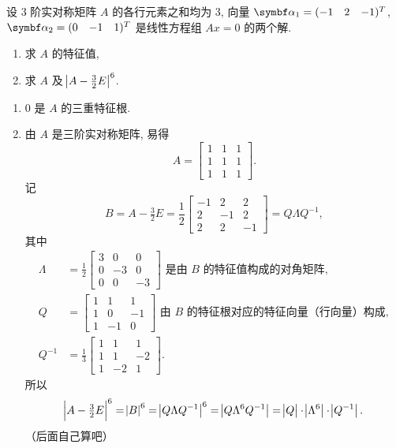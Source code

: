 \begin{exercise}
    设 $3$ 阶实对称矩阵 $A$ 的各行元素之和均为 $3$, 向量 $\vect{\alpha}_1 = (-1\quad 2\quad {-1})^T$, $\vect{\alpha}_2 = (0\quad {-1}\quad 1)^T$ 是线性方程组 $Ax = 0$ 的两个解.
    \begin{enumerate}[(1)]
        \item 求 $A$ 的特征值, 
        \item 求 $A$ 及 $\abs[1]{A-\tfrac 32 E}^6$.
    \end{enumerate}
\end{exercise}

\begin{solution}
    \begin{enumerate}[(1)]
        \item $0$ 是 $A$ 的三重特征根.
        \item 由 $A$ 是三阶实对称矩阵, 易得
        \[
        A = \begin{bmatrix}
        1 & 1 & 1\\ 1 & 1 & 1\\ 1 & 1 & 1
        \end{bmatrix}.
        \]
        记
        \[
        B = A - \tfrac 32 E = \frac 12\begin{bmatrix}
        -1 & 2 & 2 \\ 2 & -1 & 2 \\ 2 & 2 & -1
        \end{bmatrix} = Q\Lambda Q^{-1},
        \]
        其中
        \begin{align*}
        \Lambda &= \frac 12\begin{bmatrix}
        3 & 0 & 0 \\ 0 & -3 & 0 \\ 0 & 0 & -3
        \end{bmatrix} \text{\ 是由 $B$ 的特征值构成的对角矩阵}, \\
        Q &= \begin{bmatrix}
        1 & 1 & 1 \\ 1 & 0 & -1 \\ 1 & -1 & 0
        \end{bmatrix} \text{\ 由 $B$ 的特征根对应的特征向量（行向量）构成}, \\
        Q^{-1} &= \frac 13\begin{bmatrix}
        1 & 1 & 1 \\ 1 & 1 & -2 \\ 1 & -2 & 1
        \end{bmatrix}.
        \end{align*}
        所以
        \begin{align*}
            \abs[2]{A - \tfrac 32 E}^6 
            = \abs{B}^6 
            = \abs[1]{Q \Lambda Q^{-1}}^6 
            = \abs[1]{Q \Lambda^6 Q^{-1}} 
            = \abs[1]{Q} \cdot \abs[1]{\Lambda^6} \cdot \abs[1]{Q^{-1}}.
        \end{align*}
        （后面自己算吧）
    \end{enumerate}
\end{solution}

